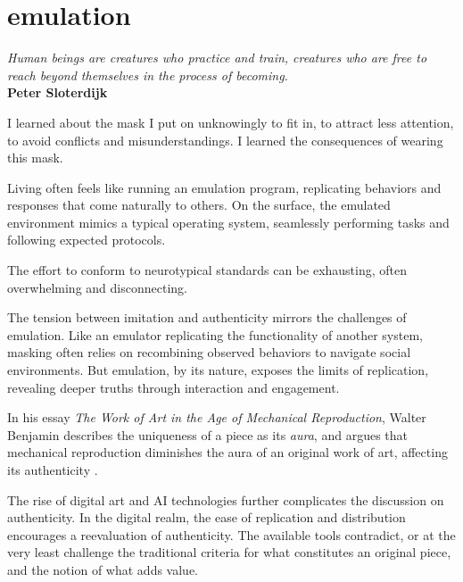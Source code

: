 \chapter*{emulation}
\begin{center}
\vspace{2cm}
\begin{flushright}
\large
\textit{Human beings are creatures who practice and train, creatures who are free to reach beyond themselves in the process of becoming.}\\
\textbf{Peter Sloterdijk} \citep{sloterdijk2014}
\end{flushright}
\vspace{2cm}
\end{center}
\normalsize

I learned about the mask I put on unknowingly to fit in, to attract less attention, to avoid conflicts and misunderstandings. I learned the consequences of wearing this mask.

Living often feels like running an emulation program, replicating behaviors and responses that come naturally to others. On the surface, the emulated environment mimics a typical operating system, seamlessly performing tasks and following expected protocols. 

The effort to conform to neurotypical standards can be exhausting, often overwhelming and disconnecting.

The tension between imitation and authenticity mirrors the challenges of emulation. Like an emulator replicating the functionality of another system, masking often relies on recombining observed behaviors to navigate social environments. But emulation, by its nature, exposes the limits of replication, revealing deeper truths through interaction and engagement.

In his essay \textit{The Work of Art in the Age of Mechanical Reproduction}, Walter Benjamin describes the uniqueness of a piece as its \textit{aura}, and argues that mechanical reproduction diminishes the aura of an original work of art, affecting its authenticity \citep{benjamin1935}. 

The rise of digital art and AI technologies further complicates the discussion on authenticity. In the digital realm, the ease of replication and distribution encourages a reevaluation of authenticity. The available tools contradict, or at the very least challenge the traditional criteria for what constitutes an original piece, and the notion of what adds value. 

